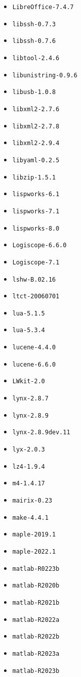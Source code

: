 \begin{multicols}{3}
\begin{itemize}
\item \verb|LibreOffice-7.4.7|
\item \verb|libssh-0.7.3|
\item \verb|libssh-0.7.6|
\item \verb|libtool-2.4.6|
\item \verb|libunistring-0.9.6|
\item \verb|libusb-1.0.8|
\item \verb|libxml2-2.7.6|
\item \verb|libxml2-2.7.8|
\item \verb|libxml2-2.9.4|
\item \verb|libyaml-0.2.5|
\item \verb|libzip-1.5.1|
\item \verb|lispworks-6.1|
\item \verb|lispworks-7.1|
\item \verb|lispworks-8.0|
\item \verb|Logiscope-6.6.0|
\item \verb|Logiscope-7.1|
\item \verb|lshw-B.02.16|
\item \verb|ltct-20060701|
\item \verb|lua-5.1.5|
\item \verb|lua-5.3.4|
\item \verb|lucene-4.4.0|
\item \verb|lucene-6.6.0|
\item \verb|LWkit-2.0|
\item \verb|lynx-2.8.7|
\item \verb|lynx-2.8.9|
\item \verb|lynx-2.8.9dev.11|
\item \verb|lyx-2.0.3|
\item \verb|lz4-1.9.4|
\item \verb|m4-1.4.17|
\item \verb|mairix-0.23|
\item \verb|make-4.4.1|
\item \verb|maple-2019.1|
\item \verb|maple-2022.1|
\item \verb|matlab-R0223b|
\item \verb|matlab-R2020b|
\item \verb|matlab-R2021b|
\item \verb|matlab-R2022a|
\item \verb|matlab-R2022b|
\item \verb|matlab-R2023a|
\item \verb|matlab-R2023b|

\end{itemize}
\end{multicols}
